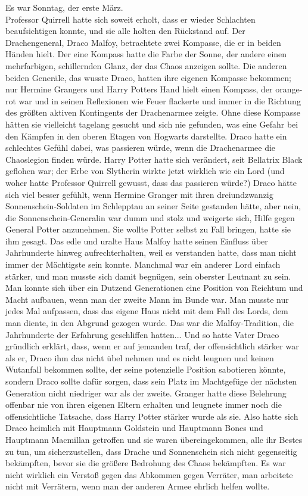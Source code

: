 {Es war Sonntag, der erste März.\\ Professor Quirrell hatte sich soweit erholt, dass er wieder Schlachten beaufsichtigen konnte, und sie alle holten den Rückstand auf. Der Drachengeneral, Draco Malfoy, betrachtete zwei Kompasse, die er in beiden Händen hielt. Der eine Kompass hatte die Farbe der Sonne, der andere einen mehrfarbigen, schillernden Glanz, der das Chaos anzeigen sollte. Die anderen beiden Generäle, das wusste Draco, hatten ihre eigenen Kompasse bekommen; nur Hermine Grangers und Harry Potters Hand hielt einen Kompass, der orange-rot war und in seinen Reflexionen wie Feuer flackerte und immer in die Richtung des größten aktiven Kontingents der Drachenarmee zeigte. Ohne diese Kompasse hätten sie vielleicht tagelang gesucht und sich nie gefunden, was eine Gefahr bei den Kämpfen in den oberen Etagen von Hogwarts darstellte. Draco hatte ein schlechtes Gefühl dabei, was passieren würde, wenn die Drachenarmee die Chaoslegion finden würde. Harry Potter hatte sich verändert, seit Bellatrix Black geflohen war; der Erbe von Slytherin wirkte jetzt wirklich wie ein Lord (und woher hatte Professor Quirrell gewusst, dass das passieren würde?) Draco hätte sich viel besser gefühlt, wenn Hermine Granger mit ihren dreiundzwanzig Sonnenschein-Soldaten im Schlepptau an seiner Seite gestanden hätte, aber nein, die Sonnenschein-Generalin war dumm und stolz und weigerte sich, Hilfe gegen General Potter anzunehmen. Sie wollte Potter selbst zu Fall bringen, hatte sie ihm gesagt. Das edle und uralte Haus Malfoy hatte seinen Einfluss über Jahrhunderte hinweg aufrechterhalten, weil es verstanden hatte, dass man nicht immer der Mächtigste sein konnte. Manchmal war ein anderer Lord einfach stärker, und man musste sich damit begnügen, sein oberster Leutnant zu sein. Man konnte sich über ein Dutzend Generationen eine Position von Reichtum und Macht aufbauen, wenn man der zweite Mann im Bunde war. Man musste nur jedes Mal aufpassen, dass das eigene Haus nicht mit dem Fall des Lords, dem man diente, in den Abgrund gezogen wurde. Das war die Malfoy-Tradition, die Jahrhunderte der Erfahrung geschliffen hatten... Und so hatte Vater Draco gründlich erklärt, dass, wenn er auf jemanden traf, der offensichtlich stärker war als er, Draco ihm das nicht übel nehmen und es nicht leugnen und keinen Wutanfall bekommen sollte, der seine potenzielle Position sabotieren könnte, sondern Draco sollte dafür sorgen, dass sein Platz im Machtgefüge der nächsten Generation nicht niedriger war als der zweite. Granger hatte diese Belehrung offenbar nie von ihren eigenen Eltern erhalten und leugnete immer noch die offensichtliche Tatsache, dass Harry Potter stärker wurde als sie. Also hatte sich Draco heimlich mit Hauptmann Goldstein und Hauptmann Bones und Hauptmann Macmillan getroffen und sie waren übereingekommen, alle ihr Bestes zu tun, um sicherzustellen, dass Drache und Sonnenschein sich nicht gegenseitig bekämpften, bevor sie die größere Bedrohung des Chaos bekämpften. Es war nicht wirklich ein Verstoß gegen das Abkommen gegen Verräter, man arbeitete nicht mit Verrätern, wenn man der anderen Armee ehrlich helfen wollte.

}
